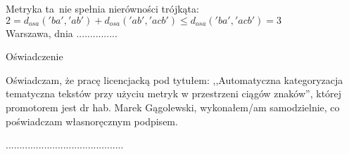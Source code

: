 \documentclass[12pt, twoside, openany]{report}
\theoremstyle{plain}
\begin{document}
Metryka ta~nie spełnia nierówności trójkąta: $2 = d_{osa}('ba', 'ab') + d_{osa}('ab', 'acb') \leq d_{osa}('ba', 'acb') = 3$\\





\clearpage
\pagestyle{empty}
\noindent Warszawa, dnia ...............
\vspace{5cm}
\begin{center}
\LARGE{Oświadczenie}
\end{center}
Oświadczam, że pracę licencjacką pod tytułem: ,,Automatyczna kategoryzacja tematyczna tekstów przy użyciu metryk w przestrzeni ciągów znaków'', której promotorem jest dr hab. Marek Gągolewski, wykonałem/am samodzielnie, co poświadczam własnoręcznym podpisem.
\vspace{2cm}
\begin{flushright}
...........................................
\end{flushright}
\end{document}
